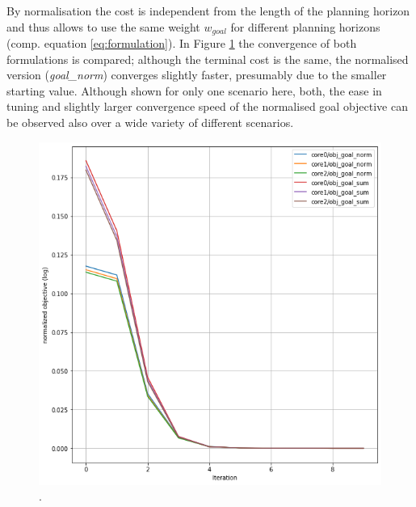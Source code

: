 By normalisation the cost is independent from the length of the planning horizon and thus allows to use the same weight $w_{goal}$ for different planning horizons (comp. equation \ref{eq:formulation}). In Figure \ref{img:goal_norm_vs_sum} the convergence of both formulations is compared; although the terminal cost is the same, the normalised version (\textit{goal\_norm}) converges slightly faster, presumably due to the smaller starting value. Although shown for only one scenario here, both, the ease in tuning and slightly larger convergence speed of the normalised goal objective can be observed also over a wide variety of different scenarios.  

\begin{figure}[!ht]
\begin{center}
\includegraphics[width=\imgwidth]{images/goal_norm_vs_sum.png}
.
\label{img:goal_norm_vs_sum}
\end{center}
\end{figure}

